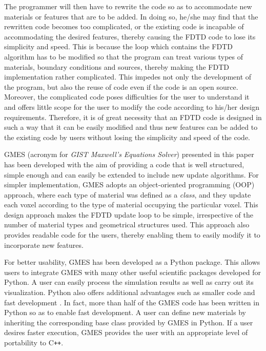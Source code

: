 The programmer will then have to rewrite the code so as to accommodate new materials or features that are to be added. In doing so, he/she may find that the rewritten code becomes too complicated, or the existing code is incapable of accommodating the desired features, thereby causing the FDTD code to lose its simplicity and speed. This is because the loop which contains the FDTD algorithm has to be modified so that the program can treat various types of materials, boundary conditions and sources, thereby making the FDTD implementation rather complicated. This impedes not only the development of the program, but also the reuse of code even if the code is an open source. Moreover, the complicated code poses difficulties for the user to understand it and offers little scope for the user to modify the code according to his/her design requirements. Therefore, it is of great necessity that an FDTD code is designed in such a way that it can be easily modified and thus new features can be added to the existing code by users without losing the simplicity and speed of the code. 

GMES (acronym for \emph{GIST Maxwell's Equations Solver}) presented in this paper has been developed with the aim of providing a code that is well structured, simple enough and can easily be extended to include new update algorithms. For simpler implementation, GMES adopts an object-oriented programming (OOP) approach, where each type of material was defined as a \emph{class}, and they update each voxel according to the type of material occupying the particular voxel. This design approach makes the FDTD update loop to be simple, irrespective of the number of material types and geometrical structures used. This approach also provides readable code for the users, thereby enabling them to easily modify it to incorporate new features.

For better usability, GMES has been developed as a Python package. This allows users to integrate GMES with many other useful scientific packages developed for Python. A user can easily process the simulation results as well as carry out its visualization. Python also offers additional advantages such as smaller code and fast development \cite{lutz_programming_2011}. In fact, more than half of the GMES code has been written in Python so as to enable fast development. A user can define new materials by inheriting the corresponding base class provided by GMES in Python. If a user desires faster execution, GMES provides the user with an appropriate level of portability to C\verb!++!. 


